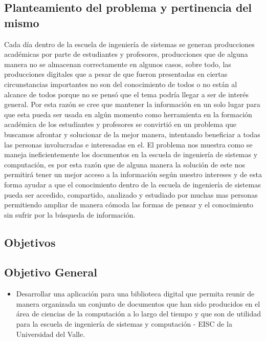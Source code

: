 \subsection{Planteamiento del problema y pertinencia del mismo}
        Cada día dentro de la escuela de ingeniería de sistemas se generan producciones académicas 			por parte de estudiantes y profesores, producciones que de alguna manera no se almacenan
        correctamente en algunos casos, sobre todo, las producciones digitales que a pesar de que
        fueron presentadas en ciertas circunstancias importantes no son del conocimiento de todos o
        no están al alcance de todos porque no se pensó que el tema podría llegar a ser de interés
        general. Por esta razón se cree que mantener la información en un solo lugar para que esta
        pueda ser usada en algún momento como herramienta en la formación académica de los 
        estudiantes y profesores se convirtió en un problema que buscamos afrontar y solucionar de
        la mejor manera, intentando beneficiar a todas las personas involucradas e interesadas en
        el.
        El problema nos muestra como se maneja ineficientemente los documentos en la escuela de
        ingeniería de sistemas y computación, es por esta razón que de alguna manera la solución de
        este nos permitirá tener un mejor acceso a la información según nuestro intereses y de esta
        forma ayudar a que el conocimiento dentro de la escuela de ingeniería de sistemas pueda ser
        accedido, compartido, analizado y estudiado por muchas mas personas permitiendo ampliar de
        manera cómoda las formas de pensar y el conocimiento sin sufrir por la búsqueda de 
        información.
        
        \subsection{Objetivos}
        	\subsection{Objetivo General}
        	\begin{itemize}
        		\item Desarrollar una aplicación para una biblioteca digital que permita reunir de
        		manera organizada un conjunto de documentos que han sido producidos en el área de
        		ciencias de la computación a lo largo del tiempo y que son de utilidad para la 
        		escuela de ingeniería de sistemas y computación - EISC de la Universidad del Valle.
        	\end{itemize}
        	
